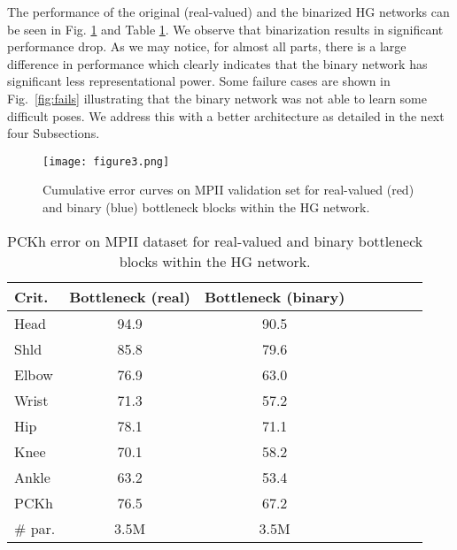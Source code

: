 \documentclass[10pt,journal,compsoc]{IEEEtran}
\begin{document}
The performance of the original (real-valued) and the binarized HG networks can be seen in Fig. \ref{fig:naive_bech} and Table \ref{tab:bootlneck_vs}. We observe that binarization results in significant performance drop. As we may notice, for almost all parts, there is a large difference in performance which clearly indicates that the binary network has significant less representational power. Some failure cases are shown in Fig.~\ref{fig:fails} illustrating that the binary network was not able to learn some difficult poses. We address this with a better architecture as detailed in the next four Subsections.

\begin{figure}[!htb]
    \centering
    \texttt{[image: figure3.png]}
    \caption{Cumulative error curves on MPII validation set for real-valued (red) and binary (blue) bottleneck blocks within the HG network.}
    \label{fig:naive_bech}
\end{figure}

\begin{table}[!htbp]
    \renewcommand{\arraystretch}{1.3}
    \caption{PCKh error on MPII dataset for real-valued and binary  bottleneck blocks within the HG network.}
    \label{tab:bootlneck_vs}
    \centering
    \begin{tabular}{|l|c|c|c|c|c|c|c|} \hline
        Crit.   & Bottleneck (real) & Bottleneck (binary) \\
        \hline\hline
        Head    & 94.9              & 90.5                \\
        Shld    & 85.8              & 79.6                \\
        Elbow   & 76.9              & 63.0                \\
        Wrist   & 71.3              & 57.2                \\
        Hip     & 78.1              & 71.1                \\
        Knee    & 70.1              & 58.2                \\
        Ankle   & 63.2              & 53.4                \\
        \hline
        PCKh    & 76.5              & 67.2                \\
        \hline
        \# par. & 3.5M              & 3.5M                \\
        \hline
    \end{tabular}
\end{table}
\end{document}
